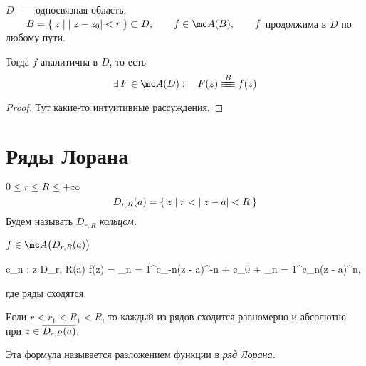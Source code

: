 \begin{theorem}
	$ D $ ~--- односвязная область, $ \qquad B = \set{z \mid |z - z_0| < r} \sub D, \qquad f \in \mc A(B), \qquad f $ продолжима в $ D $ по любому пути.

	Тогда $ f $ аналитична в $ D $, то есть
	$$ \exist F \in \mc A(D) : \quad F(z) \equiv[B] f(z) $$
\end{theorem}

\begin{proof}
	Тут какие-то интуитивные рассуждения.
\end{proof}

\section{Ряды Лорана}

\begin{definition}
	$ 0 \le r \le R \le +\infty $
	$$ D_{r, R}(a) = \Set{z \mid r < |z - a| < R} $$
	Будем называть $ D_{r, R} $ \it{кольцом}.
\end{definition}

\begin{theorem}
	$ f \in \mc A \big(D_{r, R}(a) \big) $
	\begin{equ}{11}
		\implies \exist c_n \in \Z : \quad \forall z \in D_{r, R}(a) \quad f(z) = \sum_{n = 1}^\infty c_{-n}(z - a)^{-n} + c_0 + \sum_{n = 1}^\infty c_n(z - a)^n,
	\end{equ}
	где ряды сходятся.

	Если $ r < r_1 < R_1 < R $, то каждый из рядов сходится равномерно и абсолютно при $ z \in \overline{D_{r, R}(a)} $.

	Эта формула называется разложением функции в \it{ряд Лорана}.
\end{theorem}
